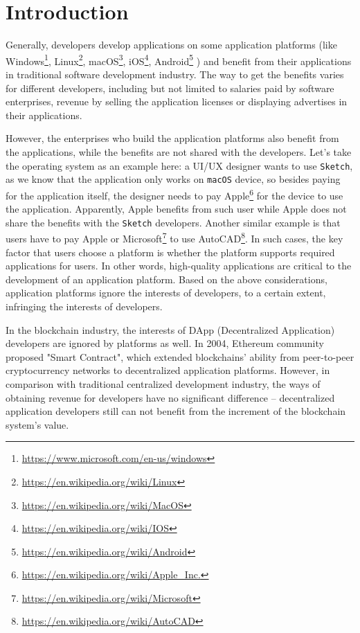 \section{Introduction}

Generally, developers develop applications on some application platforms (like
Windows\footnote{\url{https://www.microsoft.com/en-us/windows}}, Linux\footnote{\url{https://en.wikipedia.org/wiki/Linux}},
macOS\footnote{\url{https://en.wikipedia.org/wiki/MacOS}},
iOS\footnote{\url{https://en.wikipedia.org/wiki/IOS}},
Android\footnote{\url{https://en.wikipedia.org/wiki/Android}} \etc) and
benefit from their applications in traditional software development industry.
The way to get the benefits varies for different developers, including but not
limited to salaries paid by software enterprises, revenue by selling the
application licenses or displaying advertises in their applications.

However, the enterprises who build the application platforms also benefit
from the applications, while the benefits are not shared with the developers.
Let's take the operating system as an example here: a UI/UX designer wants to use \texttt{Sketch},
as we know that the application only works on \texttt{macOS} device, so besides
paying for the application itself, the designer needs to pay Apple\footnote{\url{https://en.wikipedia.org/wiki/Apple_Inc.}}
for the device  to use the application. Apparently, Apple benefits from such user while
Apple does not share the benefits with the \texttt{Sketch} developers.
Another similar example is that users have to pay Apple or
Microsoft\footnote{\url{https://en.wikipedia.org/wiki/Microsoft}} to use
AutoCAD\footnote{\url{https://en.wikipedia.org/wiki/AutoCAD}}. In such cases,
the key factor that users choose a platform is whether the platform
supports required applications for users. In other words, high-quality
applications are critical to the development of an application platform. Based on the above considerations,  application platforms ignore the interests of developers, to a certain extent, infringing the interests of developers.

In the blockchain industry, the interests of 
DApp (Decentralized Application) developers are ignored by platforms  as  well.
 In 2004, Ethereum community proposed "Smart Contract", 
which extended blockchains' ability from peer-to-peer
cryptocurrency networks to decentralized application platforms. However, in comparison with traditional centralized development industry, the ways of obtaining revenue for developers have no significant difference -- decentralized application developers still can not benefit
 from the increment of the blockchain system's value.

